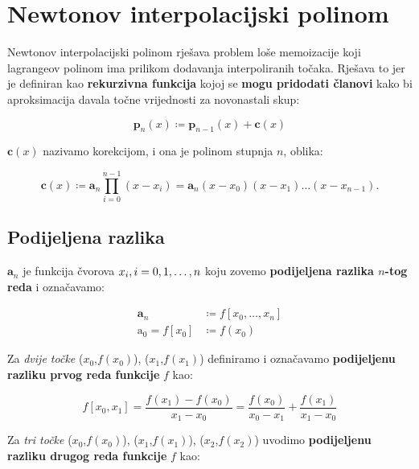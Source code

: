 
\section{Newtonov interpolacijski polinom}

Newtonov interpolacijski polinom rješava problem loše memoizacije koji lagrangeov polinom ima prilikom dodavanja interpoliranih točaka. Rješava to jer je definiran kao \textbf{rekurzivna funkcija} kojoj se \textbf{mogu pridodati članovi} kako bi aproksimacija davala točne vrijednosti za novonastali skup:

\begin{equation}
\mathbf{p}_n(x) \coloneq \mathbf{p}_{n-1}(x) + \mathbf{c}(x)
\end{equation}

$\mathbf{c}(x)$ nazivamo korekcijom, i ona je polinom stupnja $n$, oblika:

\begin{equation}
\mathbf{c}(x) \coloneq \mathbf{a}_n\prod_{i=0}^{n-1}(x-x_i) = \mathbf{a}_n(x-x_0)(x-x_1)\dots(x-x_{n-1}).
\end{equation}

\subsection{Podijeljena razlika}

$\mathbf{a}_n$ je funkcija čvorova $x_i,\space i=0, 1, \dots, n$ koju zovemo \textbf{podijeljena razlika $n$-tog reda} i označavamo:

\begin{align*}
\mathbf{a}_n &\coloneq f[x_0,\dots,x_n]\\
\mathrm{a}_0 = f[x_0] &\coloneq f(x_0)
\end{align*}

Za \textit{dvije točke} ($x_0$,$f(x_0)$), ($x_1$,$f(x_1)$) definiramo i označavamo \textbf{podijeljenu razliku prvog reda funkcije} $f$ kao:

$$
f[x_0, x_1] = \frac{f(x_1)-f(x_0)}{x_1 - x_0} = \frac{f(x_0)}{x_0 - x_1} + \frac{f(x_1)}{x_1 - x_0}
$$

Za \textit{tri točke} ($x_0$,$f(x_0)$), ($x_1$,$f(x_1)$), ($x_2$,$f(x_2)$) uvodimo \textbf{podijeljenu razliku drugog reda funkcije} $f$ kao:

